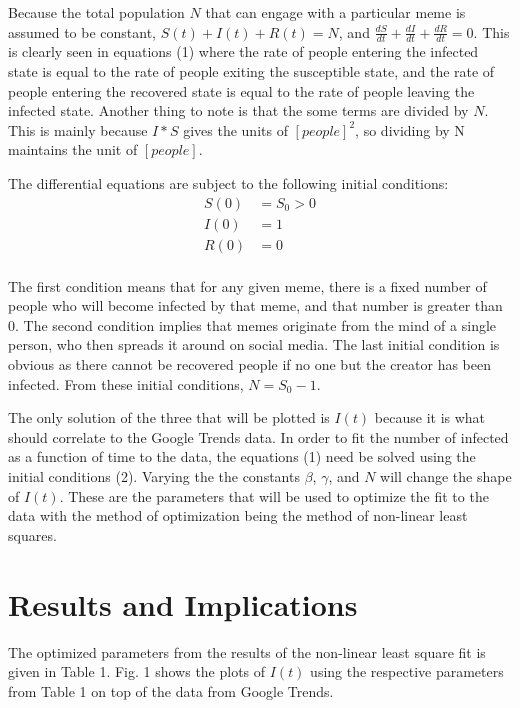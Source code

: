 \documentclass[12pt, letterpaper]{article}
\begin{document}
Because the total population $N$ that can engage with a particular meme is assumed to be constant, $S(t) + I(t) + R(t) = N$, and $\frac{dS}{dt} + \frac{dI}{dt} + \frac{dR}{dt} = 0$. This is clearly seen in equations (1) where the rate of people entering the infected state is equal to the rate of people exiting the susceptible state, and the rate of people entering the recovered state is equal to the rate of people leaving the infected state. Another thing to note is that the some terms are divided by $N$. This is mainly because $I * S$ gives the units of $[people]^2$, so dividing by N maintains the unit of $[people]$.

The differential equations are subject to the following initial conditions:
\begin{equation}
\begin{aligned}
S(0) &= S_0 > 0 \\
I(0) &= 1 \\
R(0) &= 0 \\
\end{aligned}
\label{eq: logical 2}
\end{equation}

The first condition means that for any given meme, there is a fixed number of people who will become infected by that meme, and that number is greater than 0. The second condition implies that memes originate from the mind of a single person, who then spreads it around on social media. The last initial condition is obvious as there cannot be recovered people if no one but the creator has been infected. From these initial conditions, $N = S_0 - 1$.

The only solution of the three that will be plotted is $I(t)$ because it is what should correlate to the Google Trends data. In order to fit the number of infected as a function of time to the data, the equations (1) need be solved using the initial conditions (2). Varying the the constants $\beta$, $\gamma$, and $N$  will change the shape of $I(t)$. These are the parameters that will be used to optimize the fit to the data with the method of optimization being the method of non-linear least squares.



\section*{Results and Implications}
The optimized parameters from the results of the non-linear least square fit is given in Table 1. Fig. 1 shows the plots of $I(t)$ using the respective parameters from Table 1 on top of the data from Google Trends.
\end{document}
